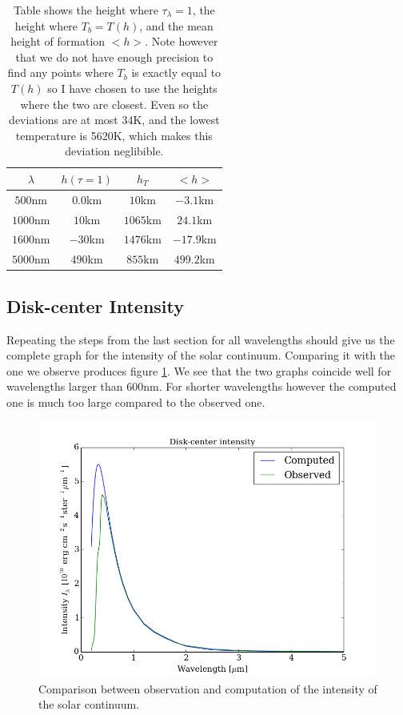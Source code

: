 \documentclass{aa}   %
\begin{document}
\begin{table}
\begin{tabular}{|c|c|c|c|}
\hline
$\lambda$&$h(\tau = 1)$ & $h_T$ &$<h>$ \\
\hline
$500$nm& $0.0$km &$10$km & $-3.1$km\\
\hline
$1000$nm&$10$km& $1065$km & $24.1$km\\
\hline
$1600$nm&$-30$km & $1476$km &$-17.9$km\\
\hline
$5000$nm&$490$km & $855$km & $499.2$km\\
\hline
\end{tabular}
\caption{Table shows the height where $\tau_\lambda = 1$, the height where $T_b = T(h)$, and the mean height of formation $<h>$. Note however that we do not have enough precision to find any points where $T_b$ is exactly equal to $T(h)$ so I have chosen to use the heights where the two are closest. Even so the deviations are at most 34K, and the lowest temperature is 5620K, which makes this deviation neglibible.}
\label{ebtable}
\end{table}

\subsection{Disk-center Intensity}
Repeating the steps from the last section for all wavelengths should give us the complete graph for the intensity of the solar continuum.
Comparing it with the one we observe produces figure \ref{intensitycompared}. We see that the two graphs coincide well for wavelengths larger than 600nm. For shorter wavelengths however the computed one is much too large compared to the observed one.

\begin{figure}
 \includegraphics[width=.49\textwidth]{intensitycompared.png}
 \caption{Comparison between observation and computation of the intensity of the solar continuum.}
 \label{intensitycompared}
\end{figure}
\end{document}
